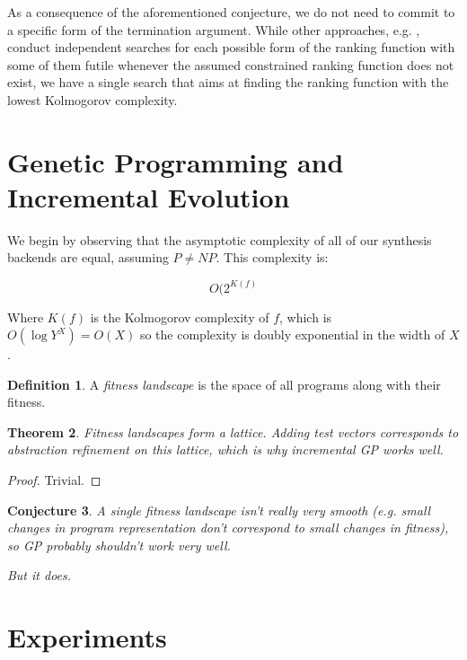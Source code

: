 \documentclass[preprint]{sigplanconf}
\newtheorem{theorem}{Theorem}
\newtheorem{conjecture}[theorem]{Conjecture}
\theoremstyle{definition}
\newtheorem{definition}[theorem]{Definition}
\begin{document}
As a consequence of the aforementioned conjecture, we do not need to commit to a specific form of the termination argument. While other approaches, e.g. \cite{DBLP:conf/tacas/LeikeH14}, 
conduct independent searches for each possible form of the ranking function with some of them futile whenever the assumed constrained ranking function does not exist, we have a single search that aims at finding the ranking function with the lowest Kolmogorov complexity. 
\fi




\section{Genetic Programming and Incremental Evolution}

We begin by observing that the asymptotic complexity of all of our synthesis
backends are equal, assuming $P \neq NP$.  This complexity is:

$$O(2^{K(f)}$$

Where $K(f)$ is the Kolmogorov complexity of $f$, which is $O(\log Y^X) = O(X)$
so the complexity is doubly exponential in the width of $X$.

\begin{definition}
 A \emph{fitness landscape} is the space of all programs along with their fitness.
\end{definition}

\begin{theorem}
 Fitness landscapes form a lattice.  Adding test vectors corresponds to abstraction refinement on this
 lattice, which is why incremental GP works well.
\end{theorem}

\begin{proof}
 Trivial.
\end{proof}


\begin{conjecture}
 A single fitness landscape isn't really very smooth (e.g. small changes in program representation
 don't correspond to small changes in fitness), so GP probably shouldn't work very well.
 
 But it does.
\end{conjecture}



\section{Experiments}
\end{document}
